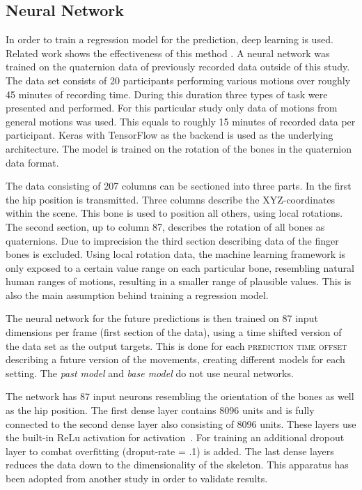 \documentclass[sigconf]{acmart}
\begin{document}
\subsection{Neural Network}
In order to train a regression model for the prediction, deep learning is used. Related work shows the effectiveness of this method \cite{Le2017}. A neural network was trained on the quaternion data of previously recorded data outside of this study. The data set consists of 20 participants performing various motions over roughly 45 minutes of recording time. During this duration three types of task were presented and performed. For this particular study only data of motions from general motions was used. This equals to roughly 15 minutes of recorded data per participant. Keras with TensorFlow as the backend is used as the underlying architecture. The model is trained on the rotation of the bones in the quaternion data format.

The data consisting of 207 columns can be sectioned into three parts. In the first the hip position is transmitted. Three columns describe the XYZ-coordinates within the scene. This bone is used to position all others, using local rotations. The second section, up to column 87, describes the rotation of all bones as quaternions. Due to imprecision the third section describing data of the finger bones is excluded. Using local rotation data, the machine learning framework is only exposed to a certain value range on each particular bone, resembling natural human ranges of motions, resulting in a smaller range of plausible values. This is also the main assumption behind training a regression model. 

The neural network for the future predictions is then trained on 87 input dimensions per frame (first section of the data), using a time shifted version of the data set as the output targets. This is done for each \textsc{prediction time offset} describing a future version of the movements, creating different models for each setting. The \textit{past model} and \textit{base model} do not use neural networks.

The network has 87 input neurons resembling the orientation of the bones as well as the hip position. The first dense layer contains 8096 units and is fully connected to the second dense layer also consisting of 8096 units. These layers use the built-in ReLu activation for activation~\cite{Agarap2018}. For training an additional dropout layer to combat overfitting \cite{Srivastava2014} (droput-rate = .1) is added. The last dense layers reduces the data down to the dimensionality of the skeleton. This apparatus has been adopted from another study in order to validate results.
\end{document}
